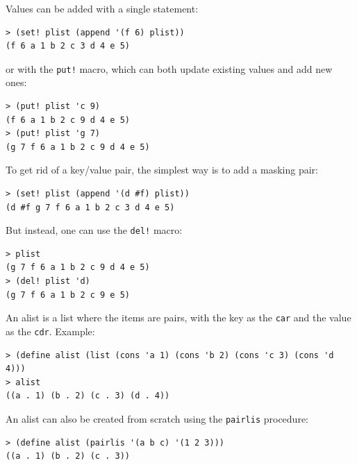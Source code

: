\documentclass[twoside,9pt]{report}
\begin{document}
{Values can be added with a single statement:

\noindent\makebox[\linewidth]{\rule{\linewidth}{0.4pt}}
\begin{lstlisting}
> (set! plist (append '(f 6) plist))
(f 6 a 1 b 2 c 3 d 4 e 5)
\end{lstlisting}
\noindent\makebox[\linewidth]{\rule{\linewidth}{0.4pt}}

or with the \texttt{put!} macro, which can both update existing values and add new ones:

\noindent\makebox[\linewidth]{\rule{\linewidth}{0.4pt}}
\begin{lstlisting}
> (put! plist 'c 9)
(f 6 a 1 b 2 c 9 d 4 e 5)
> (put! plist 'g 7)
(g 7 f 6 a 1 b 2 c 9 d 4 e 5)
\end{lstlisting}
\noindent\makebox[\linewidth]{\rule{\linewidth}{0.4pt}}

To get rid of a key/value pair, the simplest way is to add a masking pair:

\noindent\makebox[\linewidth]{\rule{\linewidth}{0.4pt}}
\begin{lstlisting}
> (set! plist (append '(d #f) plist))
(d #f g 7 f 6 a 1 b 2 c 3 d 4 e 5)
\end{lstlisting}
\noindent\makebox[\linewidth]{\rule{\linewidth}{0.4pt}}

But instead, one can use the \texttt{del!} macro:

\noindent\makebox[\linewidth]{\rule{\linewidth}{0.4pt}}
\begin{lstlisting}
> plist
(g 7 f 6 a 1 b 2 c 9 d 4 e 5)
> (del! plist 'd)
(g 7 f 6 a 1 b 2 c 9 e 5)
\end{lstlisting}
\noindent\makebox[\linewidth]{\rule{\linewidth}{0.4pt}}

An alist is a list where the items are pairs, with the key as the \texttt{car} and the value as the \texttt{cdr}. Example:

\noindent\makebox[\linewidth]{\rule{\linewidth}{0.4pt}}
\begin{lstlisting}
> (define alist (list (cons 'a 1) (cons 'b 2) (cons 'c 3) (cons 'd 4)))
> alist
((a . 1) (b . 2) (c . 3) (d . 4))
\end{lstlisting}
\noindent\makebox[\linewidth]{\rule{\linewidth}{0.4pt}}

An alist can also be created from scratch using the \texttt{pairlis} procedure:

\noindent\makebox[\linewidth]{\rule{\linewidth}{0.4pt}}
\begin{lstlisting}
> (define alist (pairlis '(a b c) '(1 2 3)))
((a . 1) (b . 2) (c . 3))
\end{lstlisting}
\noindent\makebox[\linewidth]{\rule{\linewidth}{0.4pt}}

}
\end{document}
